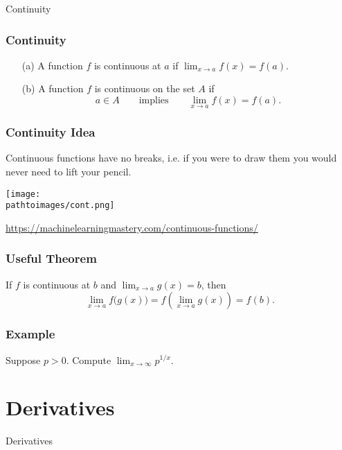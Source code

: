 \documentclass{beamer}
\newcommand{\pathtoimages}{/Users/charlesrambo/Desktop/Bootcamp24/Images}
\begin{document}
\begin{frame}
\begin{center}
\Huge Continuity
\end{center}
\end{frame}

\begin{frame}
\frametitle{Continuity}
\begin{Definition}
\begin{enumerate}
\item[(a)] A function $f$ is continuous at $a$ if $\displaystyle \lim_{x\to a} f(x) = f(a)$.
\item[(b)] A function $f$ is continuous on the set $A$ if
$$
a\in A\qquad\text{implies}\qquad \lim_{x\to a} f(x) = f(a).
$$
\end{enumerate}
\end{Definition}
\end{frame}

\begin{frame}
\frametitle{Continuity Idea}
Continuous functions have no breaks, i.e. if you were to draw them you would never need to lift your pencil. 
\begin{center}
\texttt{[image: \\pathtoimages/cont.png]}
\end{center}
\tiny\url{https://machinelearningmastery.com/continuous-functions/}
\end{frame}

\begin{frame}
\frametitle{Useful Theorem}
\begin{Theorem}
If $f$ is continuous at $b$ and $\displaystyle\lim_{x\to a} g(x) = b$, then
$$
\lim_{x\to a} f\Big(g(x)\Big) = f\left(\lim_{x\to a} g(x)\right) = f(b).
$$
\end{Theorem}
\end{frame}

\begin{frame}[t]
\frametitle{Example}
\begin{Example}
Suppose $p > 0$. Compute $\displaystyle\lim_{x\to\infty} p^{1/x}$.
\end{Example}
\end{frame}


\section{Derivatives} 

\begin{frame}
\begin{center}
\Huge Derivatives
\end{center}
\end{frame}
\end{document}
